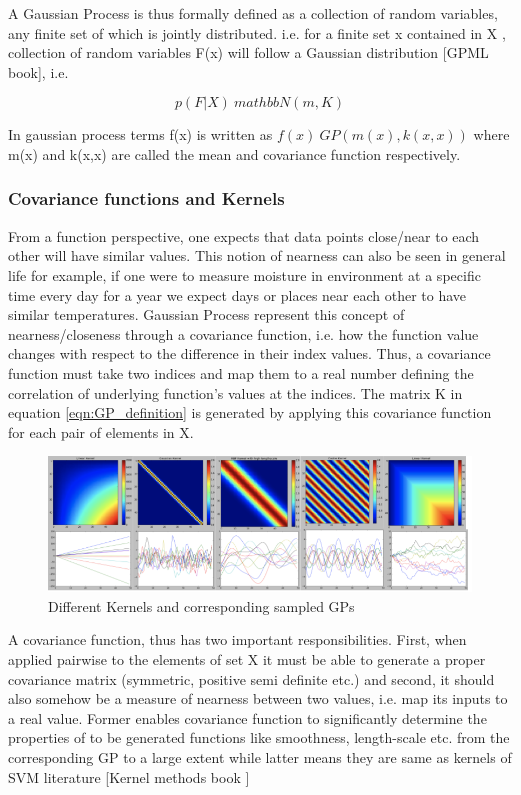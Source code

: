 A Gaussian Process is thus formally defined as a collection of random variables, any finite set of which is jointly distributed. i.e. for a finite set x contained in X , collection of random variables F(x) will follow a Gaussian distribution [GPML book], i.e. 

\begin{equation}
    p(F|X) ~ mathbb{N}(m,K)
    \label{eqn:GP_definition}
\end{equation} 

In gaussian process terms f(x) is written as $f(x) ~ GP(m(x),k(x,x))$ where m(x) and k(x,x) are called the mean and covariance function respectively. 

\subsubsection{Covariance functions and Kernels}

From a function perspective, one expects that data points close/near to each other will have similar values. This notion of nearness can also be seen in general life for example, if one were to measure moisture in environment at a specific time every day for a year we expect days or places near each other to have similar temperatures. Gaussian Process represent this concept of nearness/closeness through a covariance function, i.e. how the function value changes with respect to the difference in their index values. Thus, a covariance function must take two indices and map them to a real number defining the correlation of underlying function’s values at the indices. 
The matrix K in equation \ref{eqn:GP_definition} is generated by applying this covariance function for each pair of elements in X. 
\begin{figure}
    \centering
    \includegraphics[scale=0.5]{thesis/images/Kernels_samples.png}
    \caption{Different Kernels and corresponding sampled GPs}
    \label{fig:generic_function_space}
\end{figure}

A covariance function, thus has two important responsibilities. First, when applied pairwise to the elements of set X it must be able to generate a proper covariance matrix (symmetric, positive semi definite etc.) and second, it should also somehow be a measure of nearness between two values, i.e. map its inputs to a real value. Former enables covariance function to significantly determine the properties of to be generated functions like smoothness, length-scale etc. from the corresponding GP to a large extent while latter means they are same as kernels of SVM literature [Kernel methods book ]

